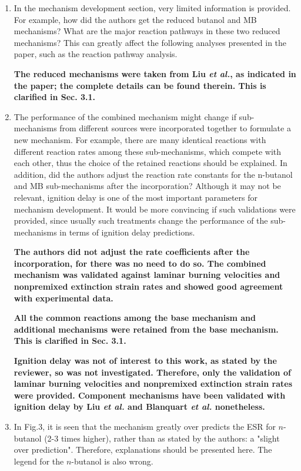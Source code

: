 \documentclass[10pt,letterpaper]{article}
\begin{document}
\begin{enumerate}
\item In the mechanism development section, very limited information is provided. For example, how did the authors get the reduced butanol and MB mechanisms? What are the major reaction pathways in these two reduced mechanisms? This can greatly affect the following analyses presented in the paper, such as the reaction pathway analysis.

\textbf{The reduced mechanisms were taken from Liu \emph{et al.}, as indicated in the paper; the complete details can be found therein.  This is clarified in Sec. 3.1.}

\item The performance of the combined mechanism might change if sub-mechanisms from different sources were incorporated together to formulate a new mechanism. For example, there are many identical reactions with different reaction rates among these sub-mechanisms, which compete with each other, thus the choice of the retained reactions should be explained. In addition, did the authors adjust the reaction rate constants for the n-butanol and MB sub-mechanisms after the incorporation? Although it may not be relevant, ignition delay is one of the most important parameters for mechanism development. It would be more convincing if such validations were provided, since usually such treatments change the performance of the sub-mechanisms in terms of ignition delay predictions.

\textbf{The authors did not adjust the rate coefficients after the incorporation, for there was no need to do so.  The combined mechanism was validated against laminar burning velocities and nonpremixed extinction strain rates and showed good agreement with experimental data. }

\textbf{All the common reactions among the base mechanism and additional mechanisms were retained from the base mechanism.  This is clarified in Sec. 3.1.}

\textbf{Ignition delay was not of interest to this work, as stated by the reviewer, so was not investigated.   Therefore, only the validation of laminar burning velocities and nonpremixed extinction strain rates were provided.  Component mechanisms have been validated with ignition delay by Liu \emph{et al.} and Blanquart \emph{et al.} nonetheless.}

\item In Fig.3, it is seen that the mechanism greatly over predicts the ESR for $n$-butanol (2-3 times higher), rather than as stated by the authors: a "slight over prediction". Therefore, explanations should be presented here. The legend for the $n$-butanol is also wrong.


\end{enumerate}
\end{document}
